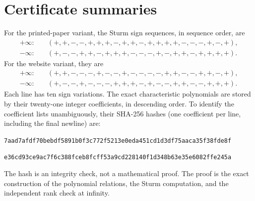 \documentclass[11pt]{article}
\theoremstyle{definition}
\begin{document}
\section{Certificate summaries}\label{app:certsummary}
For the printed-paper variant, the Sturm sign sequences, in sequence order, are
\begin{align*}
 +\infty:\quad&(+,+,-,-,+,+,+,-,+,+,-,+,+,+,+,-,-,-,+,-,+),\\
 -\infty:\quad&(+,-,-,+,+,-,+,+,+,-,-,-,+,-,+,+,-,+,+,+,+).
\end{align*}
For the website variant, they are
\begin{align*}
 +\infty:\quad&(+,+,-,-,-,+,-,-,+,-,-,-,-,+,+,-,-,+,+,-,+),\\
 -\infty:\quad&(+,-,-,+,-,-,-,+,+,+,-,+,-,-,+,+,-,-,+,+,+).
\end{align*}
Each line has ten sign variations. The exact characteristic polynomials are stored by their twenty-one integer coefficients, in descending order. To identify the coefficient lists unambiguously, their SHA-256 hashes (one coefficient per line, including the final newline) are:
\begin{description}[style=nextline]
\item[Printed paper]
\texttt{7aad7afdf70bebdf5891b0f3c772f5213e0eda451cd1d3df75aaca35f38fde8f}
\item[Website]
\texttt{e36cd93ce9ac7f6c388fceb8fcff53a9cd228140f1d348b63e35e6082ffe245a}
\end{description}
The hash is an integrity check, not a mathematical proof. The proof is the exact construction of the polynomial relations, the Sturm computation, and the independent rank check at infinity.
\end{document}
